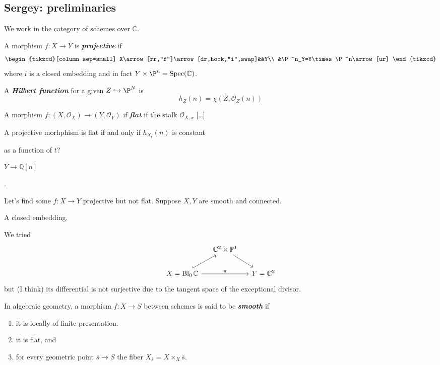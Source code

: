 \subsection{Sergey: preliminaries}
We work in the category of schemes over $\mathbb{C}$.
\begin{defn}
	A morphism $f:X\to Y$ is \textbf{\textit{projective}} if
	\[\begin{tikzcd}[column sep=small]
		X\arrow[rr,"f"]\arrow[dr,hook,"i",swap]&&Y\\
		&\P^n_Y=Y\times\P^n\arrow[ur]
	\end{tikzcd}\]
	where $i$ is a closed embedding and in fact $Y\times\P^n=\operatorname{Spec}(\mathbb{C})$.
\end{defn}
\begin{defn}
	A \textbf{\textit{Hilbert function}} for a given $Z\hookrightarrow\P^N$ is
	\[h_Z(n)=\chi(Z,\mathcal{O}_Z(n))\]
\end{defn}
\begin{defn}
	A morphism $f:(X,\mathcal{O}_X)\to(Y,\mathcal{O}_Y)$ if \textbf{\textit{flat}} if the stalk $\mathcal{O}_{X,x}$ {\color{magenta}[…]}
\end{defn}
\begin{claim}
	A projective morhphism is flat if and only if $h_{X_t}(n)$ is constant {\color{magenta}as a function of $t$?
		
	$Y\to\mathbb{Q}[n]$}.
\end{claim}
\begin{example}
	Let's find some $f:X\to Y$ projective but not flat. Suppose $X,Y$ are smooth and connected.
	
	A closed embedding.
		
		We tried
		\[\begin{tikzcd}[column sep=small]
			&\mathbb{C}^2\times\mathbb{P}^1\arrow[dr]\\
			X=\operatorname{Bl}_0\mathbb{C}\arrow[ur,hook]\arrow[rr,"\pi"]&&Y=\mathbb{C}^2
		\end{tikzcd}\]
		but {\color{magenta}(I think)} its differential is not surjective due to the tangent space of the exceptional divisor.
		
\begin{defn}
	In algebraic geometry, a morphism $f:X\to S$ between schemes is said to be \textbf{\textit{smooth}} if
	\begin{enumerate}
		\item it is locally of finite presentation.
		\item it is flat, and
		\item for every geometric point $\bar{s}\to S$ the fiber $X_{\bar{s}}=X\times_X\bar{s}$.
	\end{enumerate}
\end{defn}
	
	
	
\end{example}
